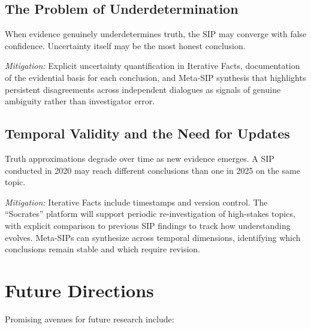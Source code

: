 \documentclass[11pt,a4paper]{article}
\begin{document}
\begin{small}
\subsection{The Problem of Underdetermination}

When evidence genuinely underdetermines truth, the SIP may converge with false confidence. Uncertainty itself may be the most honest conclusion.

\textit{Mitigation:} Explicit uncertainty quantification in Iterative Facts, documentation of the evidential basis for each conclusion, and Meta-SIP synthesis that highlights persistent disagreements across independent dialogues as signals of genuine ambiguity rather than investigator error.

\subsection{Temporal Validity and the Need for Updates}

Truth approximations degrade over time as new evidence emerges. A SIP conducted in 2020 may reach different conclusions than one in 2025 on the same topic.

\textit{Mitigation:} Iterative Facts include timestamps and version control. The ``Socrates'' platform will support periodic re-investigation of high-stakes topics, with explicit comparison to previous SIP findings to track how understanding evolves. Meta-SIPs can synthesize across temporal dimensions, identifying which conclusions remain stable and which require revision.

\section{Future Directions}

Promising avenues for future research include:


\end{small}
\end{document}
